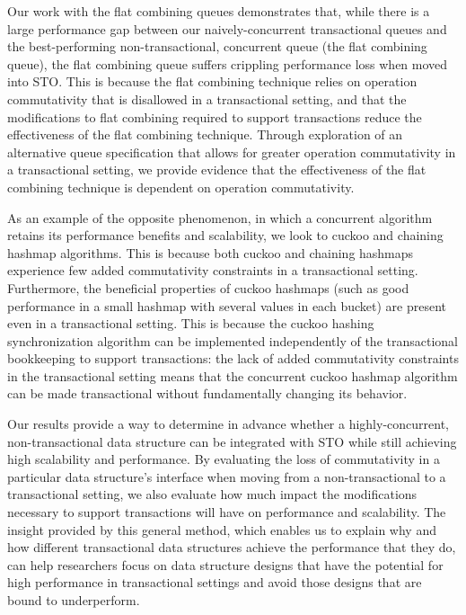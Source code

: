 Our work with the flat combining queues demonstrates that, while there is a large performance gap between our naively-concurrent transactional queues and the best-performing non-transactional, concurrent queue (the flat combining queue), the flat combining queue suffers crippling performance loss when moved into STO. This is because the flat combining technique relies on operation commutativity that is disallowed in a transactional setting, and that the modifications to flat combining required to support transactions reduce the effectiveness of the flat combining technique. Through exploration of an alternative queue specification that allows for greater operation commutativity in a transactional setting, we provide evidence that the effectiveness of the flat combining technique is dependent on operation commutativity.

As an example of the opposite phenomenon, in which a concurrent algorithm retains its performance benefits and scalability, we look to cuckoo and chaining hashmap algorithms. This is because both cuckoo and chaining hashmaps experience few added commutativity constraints in a transactional setting.
Furthermore, the beneficial properties of cuckoo hashmaps (such as good performance in a small hashmap with several values in each bucket) are present even in a transactional setting. This is because the cuckoo hashing synchronization algorithm can be implemented independently of the transactional bookkeeping to support transactions: the lack of added commutativity constraints in the transactional setting means that the concurrent cuckoo hashmap algorithm can be made transactional without fundamentally changing its behavior.

Our results provide a way to determine in advance whether a highly-concurrent, non-transactional data structure can be integrated with STO while still achieving high scalability and performance. By evaluating the loss of commutativity in a particular data structure's interface when moving from a non-transactional to a transactional setting, we also evaluate how much impact the modifications necessary to support transactions will have on performance and scalability. 
The insight provided by this general method, which enables us to explain why and how different transactional data structures achieve the performance that they do, can help researchers focus on data structure designs that have the potential for high performance in transactional settings and avoid those designs that are
bound to underperform.
